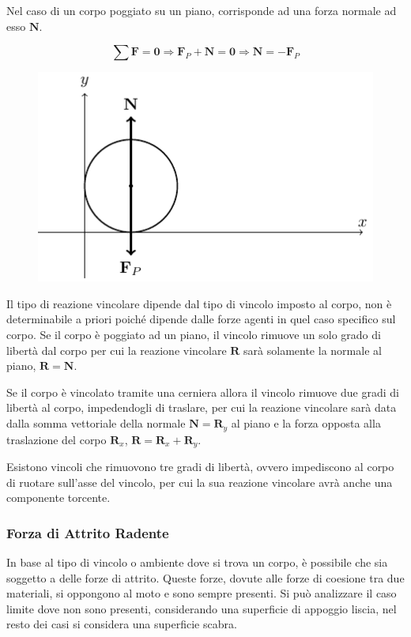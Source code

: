 \documentclass{article}
\newcommand{\vect}[1]{\boldsymbol{\mathbf{#1}}}
\numberwithin{equation}{subsection}
\begin{document}
Nel caso di un corpo poggiato su un piano, corrisponde ad una forza normale ad esso $\vect{N}$. 

\begin{equation}
    \displaystyle\sum\vect{F}=\vect{0}\Rightarrow\vect{F}_P+\vect{N}=\vect{0}\Rightarrow\vect{N}=-\vect{F}_P
\end{equation}

\begin{figure}[H]%
    \centering
    \includegraphics{reazione-vincolare.pdf}%
\end{figure}
    
Il tipo di reazione vincolare dipende dal tipo di vincolo imposto al corpo, non è determinabile a priori poiché dipende dalle forze agenti in quel caso specifico sul 
corpo. Se il corpo è poggiato ad un piano, il vincolo rimuove un solo grado di libertà dal corpo per 
cui la reazione vincolare $\vect{R}$ sarà solamente la normale al piano, $\vect{R}=\vect{N}$.  


Se il corpo è vincolato tramite una cerniera allora il vincolo rimuove due gradi di libertà al corpo, impedendogli di traslare, per cui la reazione vincolare sarà data 
dalla somma vettoriale della normale $\vect{N}=\vect{R}_y$ al piano e la forza opposta alla traslazione del corpo $\vect{R}_x$, $\vect{R}=\vect{R}_x+\vect{R}_y$.


Esistono vincoli che rimuovono tre gradi di libertà, ovvero impediscono al corpo di ruotare sull'asse del vincolo, per cui la sua reazione vincolare avrà anche una componente 
torcente. 

\subsubsection{Forza di Attrito Radente}
In base al tipo di vincolo o ambiente dove si trova un corpo, è possibile che sia soggetto a delle forze di attrito. Queste forze, dovute alle forze di coesione tra due 
materiali, si oppongono al moto e sono sempre presenti. Si può analizzare il caso limite dove non sono presenti, considerando una superficie di appoggio liscia, nel resto 
dei casi si considera una superficie scabra.
\end{document}
